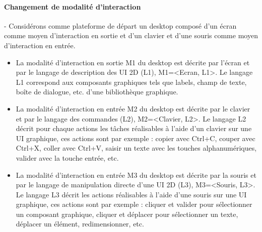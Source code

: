 \paragraph{Changement de modalité d'interaction}-
\label{sec:chap2:2:3:1}
Considérons comme plateforme de départ un desktop composé d'un écran comme moyen d'interaction en sortie et d'un clavier et d'une souris comme moyen d'interaction en entrée. 
\begin{itemize}
\item La modalité d'interaction en sortie M1  du  desktop est décrite par l'écran et par le langage de description des UI 2D (L1), M1=<Ecran, L1>. Le langage L1 correspond aux composants graphiques tels que labels, champ de texte, boîte de dialogue, etc. d'une bibliothèque graphique.
\item La modalité d'interaction en entrée M2  du  desktop est décrite par le clavier et par le langage des commandes (L2), M2=<Clavier, L2>. Le langage L2 décrit pour chaque actions les tâches réalisables à l'aide d'un clavier sur une UI graphique, ces actions sont par exemple : copier avec Ctrl+C, couper avec Ctrl+X, coller avec Ctrl+V, saisir un texte avec les touches alphanumériques, valider avec la touche entrée, etc. 
\item La modalité d'interaction en entrée M3  du  desktop est décrite par la souris et par le langage de manipulation directe d'une UI 2D (L3), M3=<Souris, L3>. Le langage L3 décrit les actions réalisables à l'aide d'une souris sur une UI graphique, ces actions sont par exemple : cliquer et valider pour sélectionner un composant graphique, cliquer et déplacer pour sélectionner un texte, déplacer un élément, redimensionner, etc. 
\end{itemize}

